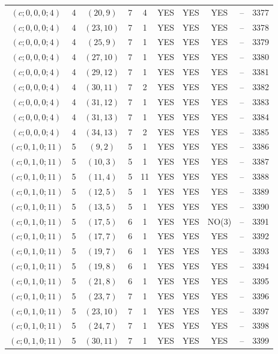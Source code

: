 \begin{longtable}{|c|c|c|c|c|c|c|c|c|c|}
$(c; 0, 0, 0; 4)$ & 4 & $(20, 9)$ & 7 & 4 & YES & YES & YES & -- & 3377\\
$(c; 0, 0, 0; 4)$ & 4 & $(23, 10)$ & 7 & 1 & YES & YES & YES & -- & 3378\\
$(c; 0, 0, 0; 4)$ & 4 & $(25, 9)$ & 7 & 1 & YES & YES & YES & -- & 3379\\
$(c; 0, 0, 0; 4)$ & 4 & $(27, 10)$ & 7 & 1 & YES & YES & YES & -- & 3380\\
$(c; 0, 0, 0; 4)$ & 4 & $(29, 12)$ & 7 & 1 & YES & YES & YES & -- & 3381\\
$(c; 0, 0, 0; 4)$ & 4 & $(30, 11)$ & 7 & 2 & YES & YES & YES & -- & 3382\\
$(c; 0, 0, 0; 4)$ & 4 & $(31, 12)$ & 7 & 1 & YES & YES & YES & -- & 3383\\
$(c; 0, 0, 0; 4)$ & 4 & $(31, 13)$ & 7 & 1 & YES & YES & YES & -- & 3384\\
$(c; 0, 0, 0; 4)$ & 4 & $(34, 13)$ & 7 & 2 & YES & YES & YES & -- & 3385\\
$(c; 0, 1, 0; 11)$ & 5 & $(9, 2)$ & 5 & 1 & YES & YES & YES & -- & 3386\\
$(c; 0, 1, 0; 11)$ & 5 & $(10, 3)$ & 5 & 1 & YES & YES & YES & -- & 3387\\
$(c; 0, 1, 0; 11)$ & 5 & $(11, 4)$ & 5 & 11 & YES & YES & YES & -- & 3388\\
$(c; 0, 1, 0; 11)$ & 5 & $(12, 5)$ & 5 & 1 & YES & YES & YES & -- & 3389\\
$(c; 0, 1, 0; 11)$ & 5 & $(13, 5)$ & 5 & 1 & YES & YES & YES & -- & 3390\\
$(c; 0, 1, 0; 11)$ & 5 & $(17, 5)$ & 6 & 1 & YES & YES & NO(3) & -- & 3391\\
$(c; 0, 1, 0; 11)$ & 5 & $(17, 7)$ & 6 & 1 & YES & YES & YES & -- & 3392\\
$(c; 0, 1, 0; 11)$ & 5 & $(19, 7)$ & 6 & 1 & YES & YES & YES & -- & 3393\\
$(c; 0, 1, 0; 11)$ & 5 & $(19, 8)$ & 6 & 1 & YES & YES & YES & -- & 3394\\
$(c; 0, 1, 0; 11)$ & 5 & $(21, 8)$ & 6 & 1 & YES & YES & YES & -- & 3395\\
$(c; 0, 1, 0; 11)$ & 5 & $(23, 7)$ & 7 & 1 & YES & YES & YES & -- & 3396\\
$(c; 0, 1, 0; 11)$ & 5 & $(23, 10)$ & 7 & 1 & YES & YES & YES & -- & 3397\\
$(c; 0, 1, 0; 11)$ & 5 & $(24, 7)$ & 7 & 1 & YES & YES & YES & -- & 3398\\
$(c; 0, 1, 0; 11)$ & 5 & $(30, 11)$ & 7 & 1 & YES & YES & YES & -- & 3399\\

\end{longtable}
